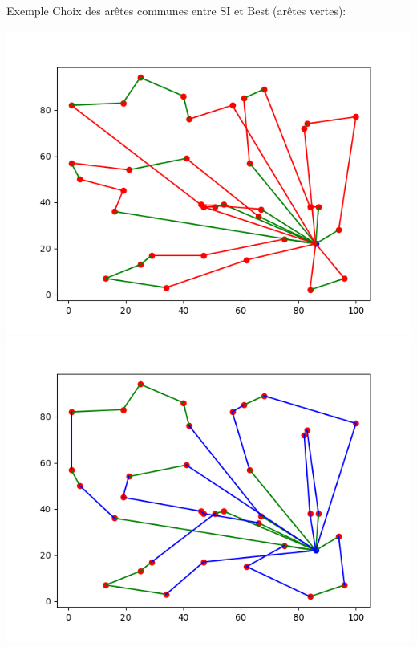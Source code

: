 \documentclass{beamer}
\begin{document}
\begin{frame}{Exemple}
Choix des arêtes communes entre SI et Best (arêtes vertes):
\begin{center}
\includegraphics[scale=0.25]{edges_init.png}
\includegraphics[scale=0.25]{edges_best.png}
\end{center}


\end{frame}
\end{document}
